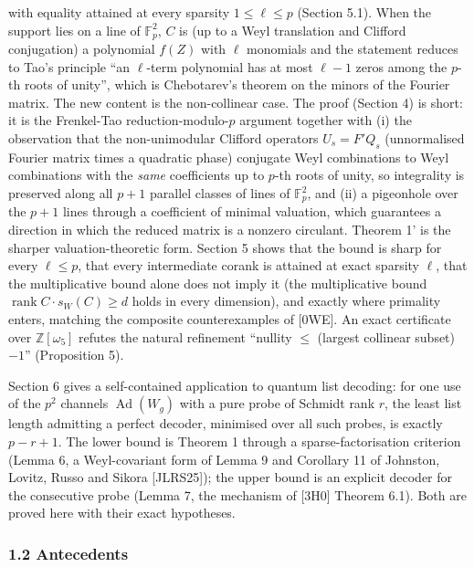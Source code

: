 \documentclass[
  11pt,
  a4paper,
]{article}
\begin{document}
with equality attained at every sparsity \(1\le\ell\le p\) (Section
5.1). When the support lies on a line of \(\mathbb F_p^2\), \(C\) is (up
to a Weyl translation and Clifford conjugation) a polynomial \(f(Z)\)
with \(\ell\) monomials and the statement reduces to Tao's principle
``an \(\ell\)-term polynomial has at most \(\ell-1\) zeros among the
\(p\)-th roots of unity'', which is Chebotarev's theorem on the minors
of the Fourier matrix. The new content is the non-collinear case. The
proof (Section 4) is short: it is the Frenkel-Tao reduction-modulo-\(p\)
argument together with (i) the observation that the non-unimodular
Clifford operators \(U_s=F'Q_s\) (unnormalised Fourier matrix times a
quadratic phase) conjugate Weyl combinations to Weyl combinations with
the \emph{same} coefficients up to \(p\)-th roots of unity, so
integrality is preserved along all \(p+1\) parallel classes of lines of
\(\mathbb F_p^2\), and (ii) a pigeonhole over the \(p+1\) lines through
a coefficient of minimal valuation, which guarantees a direction in
which the reduced matrix is a nonzero circulant. Theorem 1' is the
sharper valuation-theoretic form. Section 5 shows that the bound is
sharp for every \(\ell\le p\), that every intermediate corank is
attained at exact sparsity \(\ell\), that the multiplicative bound alone
does not imply it (the multiplicative bound
\(\operatorname{rank}C\cdot s_W(C)\ge d\) holds in every dimension), and
exactly where primality enters, matching the composite counterexamples
of {[}0WE{]}. An exact certificate over \(\mathbb Z[\omega_5]\) refutes
the natural refinement ``nullity \(\le\) (largest collinear subset)
\(-1\)'' (Proposition 5).

Section 6 gives a self-contained application to quantum list decoding:
for one use of the \(p^2\) channels \(\operatorname{Ad}(W_g)\) with a
pure probe of Schmidt rank \(r\), the least list length admitting a
perfect decoder, minimised over all such probes, is exactly \(p-r+1\).
The lower bound is Theorem 1 through a sparse-factorisation criterion
(Lemma 6, a Weyl-covariant form of Lemma 9 and Corollary 11 of Johnston,
Lovitz, Russo and Sikora {[}JLRS25{]}); the upper bound is an explicit
decoder for the consecutive probe (Lemma 7, the mechanism of {[}3H0{]}
Theorem 6.1). Both are proved here with their exact hypotheses.

\subsubsection{1.2 Antecedents}\label{antecedents}
\end{document}
